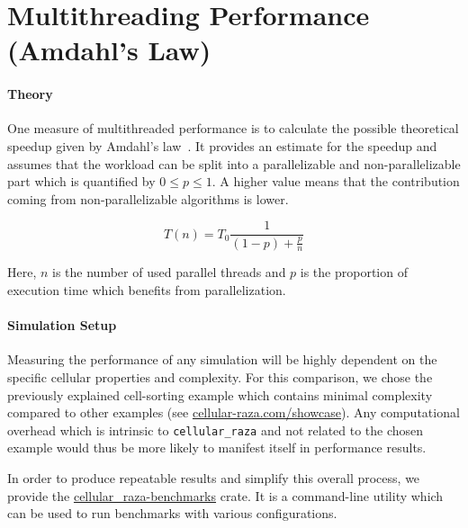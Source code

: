\documentclass[fontsize=11pt,a4paper]{article}
\begin{document}
\section{Multithreading Performance (Amdahl's Law)}

\paragraph{Theory}
One measure of multithreaded performance is to calculate the possible theoretical speedup
given by Amdahl's law~\cite{Rodgers1985}.
It provides an estimate for the speedup and assumes that the workload can be split into a
parallelizable and non-parallelizable part which is quantified by $0\leq p \leq1$.
A higher value means that the contribution coming from non-parallelizable algorithms is lower.

\begin{equation}
    T(n) = T_0\frac{1}{(1-p) + \frac{p}{n}}
    \label{eq:amdahls-law}
\end{equation}

Here, $n$ is the number of used parallel threads and $p$ is the proportion of execution time which
benefits from parallelization.

\paragraph{Simulation Setup}
Measuring the performance of any simulation will be highly dependent on the specific cellular 
properties and complexity.
For this comparison, we chose the previously explained cell-sorting example which contains minimal
complexity compared to other examples (see
\href{https://cellular-raza.com/showcase}{cellular-raza.com/showcase}).
Any computational overhead which is intrinsic to \lstinline{cellular_raza} and not related to the
chosen example would thus be more likely to manifest itself in performance results.

In order to produce repeatable results and simplify this overall process, we provide the
\href{https://github.com/jonaspleyer/cellular_raza-benchmarks}{cellular\_raza-benchmarks} crate.
It is a command-line utility which can be used to run benchmarks with various configurations.
\end{document}
